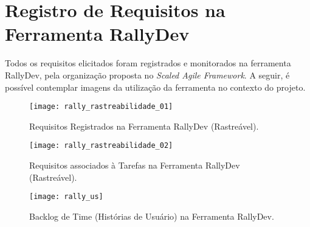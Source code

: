 \chapter[Registro de Requisitos na Ferramenta RallyDev]{Registro de Requisitos na Ferramenta RallyDev}
\label{chap:ferramenta}
	Todos os requisitos elicitados foram registrados e monitorados na ferramenta RallyDev, pela organização proposta no \emph{Scaled Agile Framework}. A seguir, é possível contemplar imagens da utilização da ferramenta no contexto do projeto.
	\begin{figure}[H]
		\centering
		\texttt{[image: rally\_rastreabilidade\_01]}
		\caption[Requisitos Registrados na Ferramenta RallyDev (Rastreável)]{Requisitos Registrados na Ferramenta RallyDev (Rastreável).}
		\label{fig:rastreabilidadeum}
	\end{figure}
	\begin{landscape}
		\vspace*{\fill}
		\begin{figure}[H]
			\centering
			\texttt{[image: rally\_rastreabilidade\_02]}
			\caption[Requisitos associados à Tarefas na Ferramenta RallyDev (Rastreável)]{Requisitos associados à Tarefas na Ferramenta RallyDev (Rastreável).}
			\label{fig:rastreabilidadedois}
		\end{figure}
		\vspace*{\fill}
	\end{landscape}
	\begin{landscape}
		\vspace*{\fill}
		\begin{figure}[H]
			\centering
			\texttt{[image: rally\_us]}
			\caption[Backlog de Time (Histórias de Usuário) na Ferramenta RallyDev]{Backlog de Time (Histórias de Usuário) na Ferramenta RallyDev.}
			\label{fig:rallyus}
		\end{figure}
		\vspace*{\fill}
	\end{landscape}